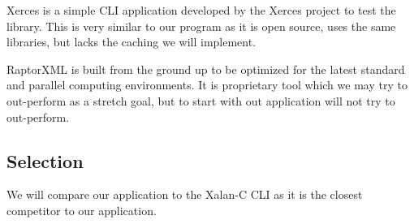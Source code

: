 Xerces is a simple CLI application developed by the Xerces project to test the library.
This is very similar to our program as it is open source, uses the same libraries, but lacks the caching we will implement.

RaptorXML is built from the ground up to be optimized for the latest standard and parallel computing environments.
It is proprietary tool which we may try to out-perform as a stretch goal, but to start with out application will not try to out-perform.

\subsection{Selection}

We will compare our application to the Xalan-C CLI as it is the closest competitor to our application.
